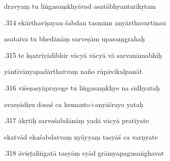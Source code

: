 \documentclass[article,12pt,a4paper]{memoir}%
\newcounter{parCount}
\begin{document}
	  
	  \pstart \leavevmode%
	dravyaṃ tu liṅgasaṃkhyāvad asatābhyantarīkṛtam 
	{}
	\pend%
      

	  
	  \pstart {}.314 ekārthaviṣayau śabdau tasminn anyārthavartinau 
	{}
	\pend%
      

	  
	  \pstart \leavevmode%
	asataiva tu bhedānāṃ sarveṣām upasaṃgrahaḥ 
	{}
	\pend%
      

	  
	  \pstart {}.315 te kṣatriyādibhir vācyā vācyā vā sarvanāmabhiḥ 
	{}
	\pend%
      

	  
	  \pstart \leavevmode%
	yāntīvānyapadārthatvaṃ naño rūpāvikalpanāt 
	{}
	\pend%
      

	  
	  \pstart {}.316 viśeṣasyāprayoge tu liṅgasaṃkhye na sidhyataḥ 
	{}
	\pend%
      

	  
	  \pstart \leavevmode%
	avarṣādiṣu dosaś ca hemanto+anyāśrayo yataḥ 
	{}
	\pend%
      

	  
	  \pstart {}.317 ākṛtiḥ sarvaśabdānāṃ yadā vācyā pratīyate 
	{}
	\pend%
      

	  
	  \pstart \leavevmode%
	ekatvād ekaśabdatvaṃ nyāyyaṃ tasyāś ca varṇyate 
	{}
	\pend%
      

	  
	  \pstart {}.318 āviṣṭaliṅgatā tasyāṃ syād grāmyapagusaṅghavat 
	{}
	\pend%
      
\end{document}
